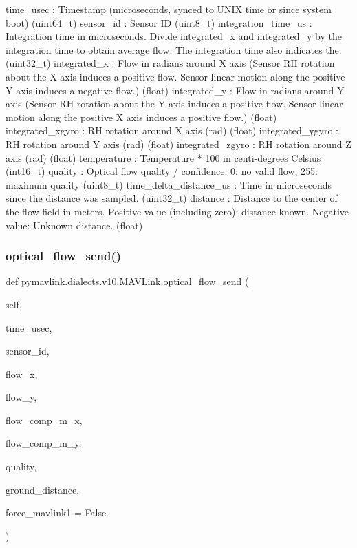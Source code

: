 \begin{DoxyVerb}
\begin{DoxyVerb}
\begin{DoxyVerb}
\begin{DoxyVerb}
\begin{DoxyVerb}
time_usec                 : Timestamp (microseconds, synced to UNIX time or since system boot) (uint64_t)
sensor_id                 : Sensor ID (uint8_t)
integration_time_us        : Integration time in microseconds. Divide integrated_x and integrated_y by the integration time to obtain average flow. The integration time also indicates the. (uint32_t)
integrated_x              : Flow in radians around X axis (Sensor RH rotation about the X axis induces a positive flow. Sensor linear motion along the positive Y axis induces a negative flow.) (float)
integrated_y              : Flow in radians around Y axis (Sensor RH rotation about the Y axis induces a positive flow. Sensor linear motion along the positive X axis induces a positive flow.) (float)
integrated_xgyro          : RH rotation around X axis (rad) (float)
integrated_ygyro          : RH rotation around Y axis (rad) (float)
integrated_zgyro          : RH rotation around Z axis (rad) (float)
temperature               : Temperature * 100 in centi-degrees Celsius (int16_t)
quality                   : Optical flow quality / confidence. 0: no valid flow, 255: maximum quality (uint8_t)
time_delta_distance_us        : Time in microseconds since the distance was sampled. (uint32_t)
distance                  : Distance to the center of the flow field in meters. Positive value (including zero): distance known. Negative value: Unknown distance. (float)\end{DoxyVerb}
 \mbox{\label{classpymavlink_1_1dialects_1_1v10_1_1MAVLink_abc9c3e35510666e71ae6e98b7d3f4ada}} 
\subsubsection{\texorpdfstring{optical\+\_\+flow\+\_\+send()}{optical\_flow\_send()}}
{\footnotesize\ttfamily def pymavlink.\+dialects.\+v10.\+M\+A\+V\+Link.\+optical\+\_\+flow\+\_\+send (\begin{DoxyParamCaption}\item[{}]{self,  }\item[{}]{time\+\_\+usec,  }\item[{}]{sensor\+\_\+id,  }\item[{}]{flow\+\_\+x,  }\item[{}]{flow\+\_\+y,  }\item[{}]{flow\+\_\+comp\+\_\+m\+\_\+x,  }\item[{}]{flow\+\_\+comp\+\_\+m\+\_\+y,  }\item[{}]{quality,  }\item[{}]{ground\+\_\+distance,  }\item[{}]{force\+\_\+mavlink1 = {\ttfamily False} }\end{DoxyParamCaption})}


\end{DoxyVerb}
\end{DoxyVerb}
\end{DoxyVerb}
\end{DoxyVerb}
